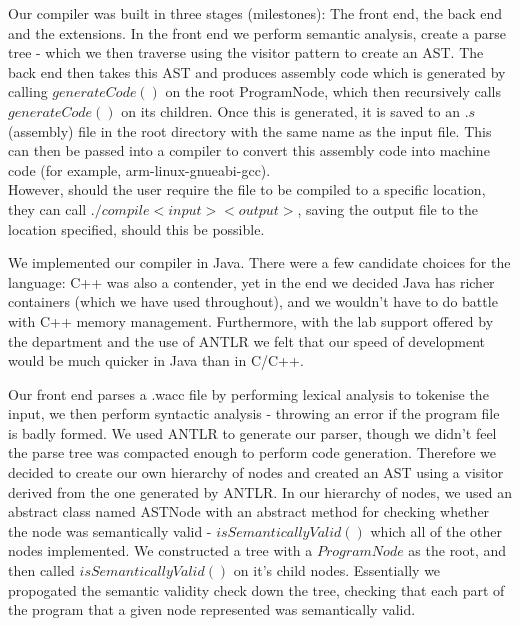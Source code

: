\documentclass[a4paper, 11pt]{article} %
\begin{document}

Our compiler was built in three stages (milestones): The front end, the back end and the extensions. In the front end we perform semantic analysis, create a parse tree - which we then traverse using the visitor pattern to create an AST. The back end then takes this AST and produces assembly code which is generated by calling $ generateCode() $ on the root ProgramNode, which then recursively calls $ generateCode() $ on its children. Once this is generated, it is saved to an $ .s $ (assembly) file in the root directory with the same name as the input file. This can then be passed into a compiler to convert this assembly code into machine code (for example, arm-linux-gnueabi-gcc). \\
However, should the user require the file to be compiled to a specific location, they can call $ ./compile < input > < output > $, saving the output file to the location specified, should this be possible.


We implemented our compiler in Java. There were a few candidate choices for the language: C++ was also a contender, yet in the end we decided Java has richer containers (which we have used throughout), and we wouldn't have to do battle with C++ memory management. Furthermore, with the lab support offered by the department and the use of ANTLR we felt that our speed of development would be much quicker in Java than in C/C++. 

Our front end parses a .wacc file by performing lexical analysis to tokenise the input, we then perform syntactic analysis - throwing an error if the program file is badly formed. We used ANTLR to generate our parser, though we didn't feel the parse tree was compacted enough to perform code generation. Therefore we decided to create our own hierarchy of nodes and created an AST using a visitor derived from the one generated by ANTLR. 
In our hierarchy of nodes, we used an abstract class named ASTNode with an abstract method for checking whether the node was semantically valid - $ isSemanticallyValid() $ which all of the other nodes implemented.  We constructed a tree with a $ ProgramNode $ as the root, and then called $ isSemanticallyValid() $ on it's child nodes. Essentially we propogated the semantic validity check down the tree, checking that each part of the program that a given node represented was semantically valid.
\end{document}
